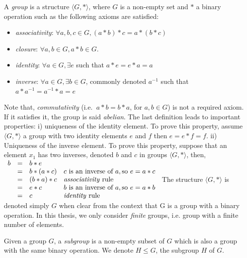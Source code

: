 \begin{definition}[Group]
 A \emph{group} is a structure $\langle G, * \rangle$, where $G$ is a non-empty set and $*$ a binary
 operation such as the following axioms are satisfied:
 \begin{itemize}[noitemsep,nolistsep]
  \item \emph{associativity}: $\forall a, b, c \in G, (a * b) * c = a * (b * c)$
  \item \emph{closure}: $\forall a, b \in G, a * b \in G$.
  \item \emph{identity}: $\forall a \in G, \exists e$ such that $ a * e = e * a = a$
  \item \emph{inverse}:  $\forall a \in G, \exists b \in G$, commonly denoted $a^{-1}$ such that
  $a * a^{-1} = a^{-1} * a = e$
 \end{itemize}
\end{definition}
Note that, \emph{commutativity} (i.e. $\ a * b = b * a$, for $a, b \in G$) is not a required axiom.
If it satisfies it, the group is said \emph{abelian}.
The last definition leads to important properties: i) uniqueness of the identity element. 
To prove this property, assume $\langle G, * \rangle$ a group with two identity elements $e$ and $f$ 
then $ e = e * f = f$.
ii) Uniqueness of the inverse element. To prove this property, suppose that an element $x_1$ has two inverses,
denoted $b$ and $c$ in groups $\langle G, * \rangle$, then,\\
 $\begin{array}{lcll}     
b & = & b * e & \\
& = & b * (a * c) & c \text{ is an inverse of } a, \text{so } e = a * c\\
& = & (b * a) * c &   \text{\emph{associativity} rule}\\
& = & e * c       & b \text{ is an inverse of } a, \text{so } e = a * b\\
& = & c           &   \text{\emph{identity} rule}
\end{array}$
The structure $\langle G, * \rangle$ is denoted simply $G$ when clear from the context that G is a group
with a binary operation. In this thesis, we only consider \emph{finite} groups, i.e. group with a finite number of elements.
\begin{definition}[Subgroup]
Given a group $G$, a \emph{subgroup} is a non-empty subset of $G$ which is also a group with 
the same binary operation. We denote $H \leq G$, the subgroup $H$ of $G$.
\end{definition}
